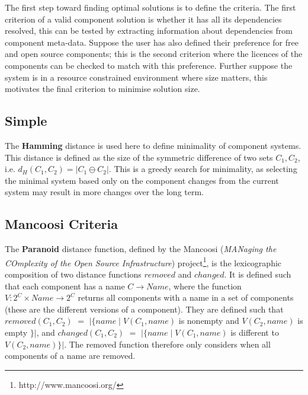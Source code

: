 The first step toward finding optimal solutions is to define the criteria.
The first criterion of a valid component solution is whether it has all its dependencies resolved,
this can be tested by extracting information about dependencies from component meta-data.
Suppose the user has also defined their preference for free and open source components;
this is the second criterion where the licences of the components can be checked to match with this preference.
Further suppose the system is in a resource constrained environment where size matters, 
this motivates the final criterion to minimise solution size.



\subsection{Simple}
The \textbf{Hamming} distance \cite{hamming1950error} is used here to define minimality of component systems.
This distance is defined as the size of the symmetric difference of two sets $C_1,C_2$, 
i.e. $d_H(C_1,C_2) = |C_1 \ominus C_2|$.
This is a greedy search for minimality, 
as selecting the minimal system based only on the component changes from the current system may result in more changes over the long term.


\subsection{Mancoosi Criteria}






The \textbf{Paranoid} distance function, 
defined by the Mancoosi (\textit{MANaging the COmplexity of the Open Source Infrastructure}) project\footnote{http://www.mancoosi.org/}, 
is the lexicographic composition of two distance functions $removed$ and $changed$.
It is defined such that each component has a name $C \rightarrow Name$,
where the function $V: 2^C \times Name \rightarrow 2^C$ returns all components with a name in a set of components 
(these are the different versions of a component).
They are defined such that $removed(C_1,C_2)$ $=$ $|\{name \mid V(C_1,name) $ is nonempty and $V(C_2,name)$ is empty $\}|$,
and $changed(C_1,C_2)$ $=$ $|\{name \mid V(C_1,name)$ is different to $V(C_2,name)\}|$.
The removed function therefore only considers when all components of a name are removed. 

